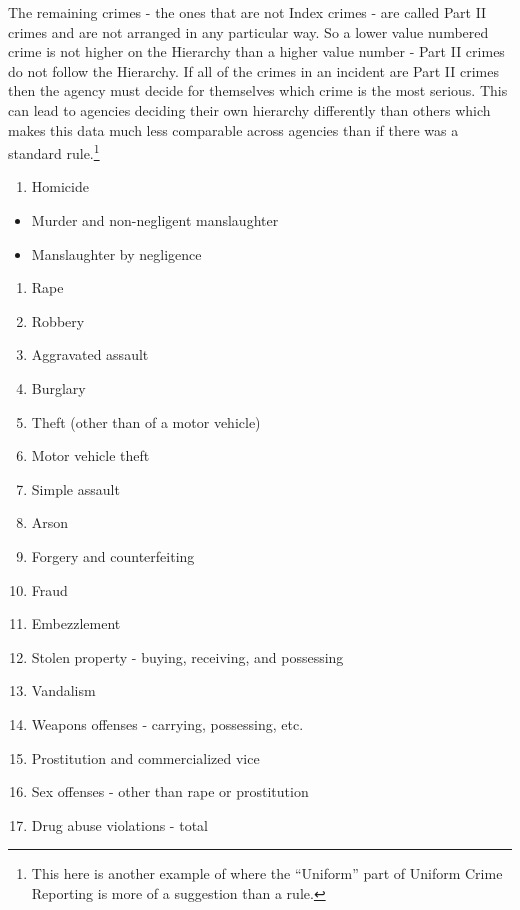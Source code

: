 \documentclass[
]{krantz}
\providecommand{\tightlist}{%
  \setlength{\itemsep}{0pt}\setlength{\parskip}{0pt}}
\begin{document}
The remaining crimes - the ones that are not Index crimes -
are called Part II crimes and are not arranged in any
particular way. So a lower value numbered crime is not
higher on the Hierarchy than a higher value number - Part II
crimes do not follow the Hierarchy. If all of the crimes in
an incident are Part II crimes then the agency must decide
for themselves which crime is the most serious. This can
lead to agencies deciding their own hierarchy differently
than others which makes this data much less comparable
across agencies than if there was a standard
rule.\footnote{This here is another example of where the
  ``Uniform'' part of Uniform Crime Reporting is more of a
  suggestion than a rule.}

\begin{enumerate}
\def\labelenumi{\arabic{enumi}.}
\tightlist
\item
  Homicide
\end{enumerate}

\begin{itemize}
\tightlist
\item
  Murder and non-negligent manslaughter
\item
  Manslaughter by negligence
\end{itemize}

\begin{enumerate}
\def\labelenumi{\arabic{enumi}.}
\setcounter{enumi}{1}
\tightlist
\item
  Rape
\item
  Robbery
\item
  Aggravated assault
\item
  Burglary
\item
  Theft (other than of a motor vehicle)
\item
  Motor vehicle theft
\item
  Simple assault
\item
  Arson
\item
  Forgery and counterfeiting
\item
  Fraud
\item
  Embezzlement
\item
  Stolen property - buying, receiving, and possessing
\item
  Vandalism
\item
  Weapons offenses - carrying, possessing, etc.
\item
  Prostitution and commercialized vice
\item
  Sex offenses - other than rape or prostitution
\item
  Drug abuse violations - total
\end{enumerate}
\end{document}

